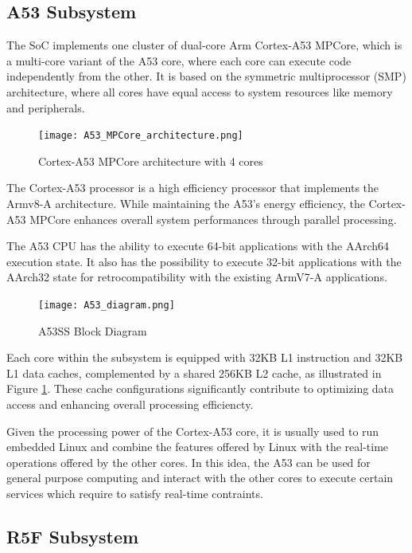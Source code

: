 \subsection{A53 Subsystem}

The SoC implements one cluster of dual-core Arm Cortex-A53 MPCore, which is
a multi-core variant of the A53 core, where each core can execute code 
independently from the other.
It is based on the symmetric multiprocessor (SMP) architecture, where all
cores have equal access to system resources like memory and peripherals.


\begin{figure}[H]
    \centering
    \texttt{[image: A53\_MPCore\_architecture.png]}
    \caption{Cortex-A53 MPCore architecture with 4 cores}
\end{figure}

The Cortex-A53 processor is a high efficiency processor that implements the
Armv8-A architecture. While maintaining the A53's energy efficiency, the
Cortex-A53 MPCore enhances overall system performances through parallel
processing.

The A53 CPU has the ability to execute 64-bit applications with the AArch64
execution state. It also has the possibility to execute 32-bit applications
with the AArch32 state for retrocompatibility with the existing ArmV7-A
applications.

\begin{figure}[H]
    \centering
    \texttt{[image: A53\_diagram.png]}
    \caption{A53SS Block Diagram}
    \label{fig:A53_diagram}
\end{figure}

Each core within the subsystem is equipped with 32KB L1 instruction and 32KB
L1 data caches, complemented by a shared 256KB L2 cache, as illustrated in
Figure \ref{fig:A53_diagram}. These cache configurations significantly
contribute to optimizing data access and enhancing overall processing
efficiencty.

Given the processing power of the Cortex-A53 core, it is usually used to run
embedded Linux and combine the features offered by Linux with the real-time
operations offered by the other cores.
In this idea, the A53 can be used for general purpose computing and interact
with the other cores to execute certain services which require to satisfy
real-time contraints.

\subsection{R5F Subsystem}

